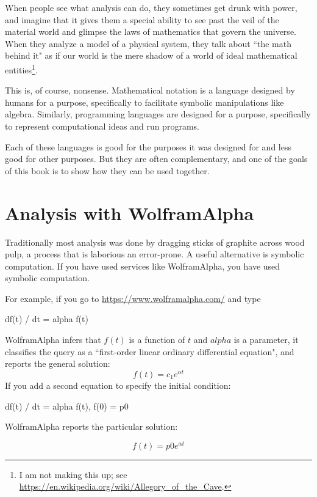 \documentclass[12pt]{book}
\theoremstyle{exercise}
\begin{document}
When people see what analysis can do, they sometimes get drunk with power, and imagine that it gives them a special ability to see past the veil of the material world and glimpse the laws of mathematics that govern the universe.  When they analyze a model of a physical system, they talk about ``the math behind it" as if our world is the mere shadow of a world of ideal mathematical entities\footnote{I am not making this up; see \url{https://en.wikipedia.org/wiki/Allegory_of_the_Cave}.}.

This is, of course, nonsense.  Mathematical notation is a language designed by humans for a purpose, specifically to facilitate symbolic manipulations like algebra.  Similarly, programming languages are designed  for a purpose, specifically to represent computational ideas and run programs.

Each of these languages is good for the purposes it was designed for and less good for other purposes.  But they are often complementary, and one of the goals of this book is to show how they can be used together.


\section{Analysis with WolframAlpha}

Traditionally most analysis was done by dragging sticks of graphite across wood pulp, a process that is laborious an error-prone.  A useful alternative is symbolic computation.  If you have used services like WolframAlpha, you have used symbolic computation.

For example, if you go to \url{https://www.wolframalpha.com/} and type

\begin{python}
df(t) / dt = alpha f(t)
\end{python}

WolframAlpha infers that $f(t)$ is a function of $t$ and $alpha$ is a parameter, it classifies the query as a ``first-order linear ordinary differential equation", and reports the general solution:
%
\[ f(t) = c_1 e^{\alpha t} \]
%
If you add a second equation to specify the initial condition:

\begin{python}
df(t) / dt = alpha f(t),  f(0) = p0
\end{python}

WolframAlpha reports the particular solution:

\[ f(t) = p0 e^{\alpha t} \]
\end{document}

